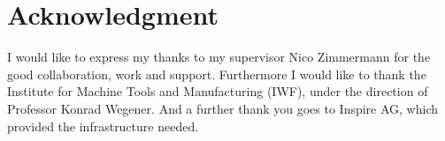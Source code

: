 \chapter*{Acknowledgment}

I would like to express my thanks to my supervisor Nico Zimmermann for the good collaboration, work and support. Furthermore I would like to thank the Institute for Machine Tools and Manufacturing (IWF), under the direction of Professor Konrad Wegener.  And a further thank you goes to Inspire AG, which provided the infrastructure needed.

